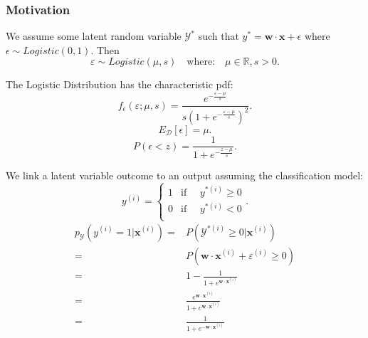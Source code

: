 \subsubsection{Motivation}
We assume some latent random variable $\mathcal{Y}^{*}$ such that
$y^{*}=\mathbf{w\cdot x}+\epsilon$ where $\epsilon\sim Logistic(0,1)$. Then
\[\varepsilon\sim Logistic(\mu,s)\quad\text{where:}\quad\mu\in \mathbb{R},s>0.\]
\begin{definition}
  The Logistic Distribution has the characteristic pdf:
\[f_\epsilon\left( \varepsilon;\mu,s \right) =\frac{e^{-\frac{\varepsilon-\mu}{s}}}{s{\left( 1+e^{-\frac{\varepsilon-\mu}{s}} \right) }^{2}}.\] 
\[E_\mathcal{D}[\epsilon]=\mu.\] 
\[P(\epsilon<z)=\frac{1}{1+e^{-\frac{z-\mu}{s}}}.\] 
\end{definition}
We link a latent variable outcome to an output assuming the classification
model:
\[y^{(i)}=\begin{cases}
  1&\text{if }\quad y^{*(i)}\ge 0\\
  0&\text{if }\quad y^{*(i)}< 0\\
\end{cases}.\]
\begin{align*}
  p_\mathcal{Y}\left( y^{(i)}=1|\mathbf{x}^{(i)} \right)=&P\left(\mathcal{Y}^{*(i)}\ge 0|\mathbf{x}^{(i)}\right)\\
  =&P\left( \mathbf{w\cdot x}^{(i)}+\varepsilon^{(i)} \ge 0\right)\\
  =&1-\frac{1}{1+e^{\mathbf{w\cdot x}^{(i)}}}\\
  =&\frac{e^{\mathbf{w\cdot x}^{(i)}}}{1+e^{\mathbf{w\cdot x}^{(i)}}}\\
  =&\frac{1}{1+e^{-\mathbf{w\cdot x}^{(i)}}}\\
\end{align*}
